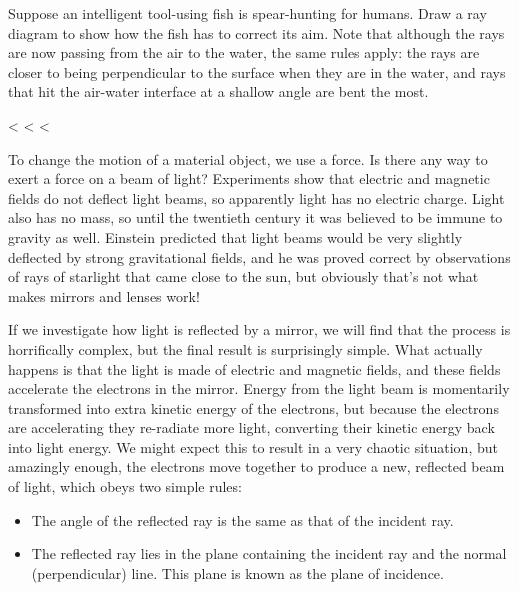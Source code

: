 \startdq

\begin{dq}
Suppose an intelligent tool-using fish is spear-hunting for
humans. Draw a ray diagram to show how the fish has to
correct its aim. Note that although the rays are now passing
from the air to the water, the same rules apply: the rays
are closer to being perpendicular to the surface when they
are in the water, and rays that hit the air-water interface
at a shallow angle are bent the most.
\end{dq}

<%
<%
<%

To change the motion of a material object, we use a force.
Is there any way to exert a force on a beam of light?
Experiments show that electric and magnetic fields do not
deflect light beams, so apparently light has no electric
charge. Light also has no mass, so until the twentieth
century it was believed to be immune to gravity as well.
Einstein predicted that light beams would be very slightly
deflected by strong gravitational fields, and he was proved
correct by observations of rays of starlight that came close
to the sun, but obviously that's not what makes mirrors and lenses work!

If we investigate how light is reflected by a mirror, we
will find that the process is horrifically complex, but the
final result is surprisingly simple. What actually happens
is that the light is made of electric and magnetic fields,
and these fields accelerate the electrons in the mirror.
Energy from the light beam is momentarily transformed into
extra kinetic energy of the electrons, but because the
electrons are accelerating they re-radiate more light,
converting their kinetic energy back into light energy. We
might expect this to result in a very chaotic situation, but
amazingly enough, the electrons move together to produce a
new, reflected beam of light, which obeys two simple rules:

\begin{itemize}

\item The angle of the reflected ray is the same as that
of the incident ray.

\item The reflected ray lies in the plane containing the
incident ray and the normal (perpendicular) line. This plane
is known as the plane of incidence.

\end{itemize}

